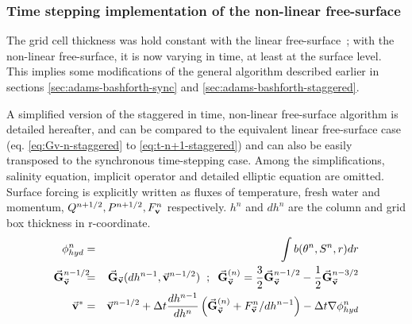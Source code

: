 \subsubsection{Time stepping implementation of the
non-linear free-surface}
\label{sec:nonlin-freesurf-timestepping}

The grid cell thickness was hold constant with the linear
free-surface~; with the non-linear free-surface, it is now varying
in time, at least at the surface level.
This implies some modifications of the general algorithm described
earlier in sections \ref{sec:adams-bashforth-sync} and
\ref{sec:adams-bashforth-staggered}.

A simplified version of the staggered in time, non-linear
free-surface algorithm is detailed hereafter, and can be compared
to the equivalent linear free-surface case (eq. \ref{eq:Gv-n-staggered}
to \ref{eq:t-n+1-staggered}) and can also be easily transposed
to the synchronous time-stepping case.
Among the simplifications, salinity equation, implicit operator
and detailed elliptic equation are omitted. Surface forcing is
explicitly written as fluxes of temperature, fresh water and
momentum, $Q^{n+1/2}, P^{n+1/2}, F_{\bf v}^n$ respectively.
$h^n$ and $dh^n$ are the column and grid box thickness in r-coordinate.
\begin{eqnarray}
\phi^{n}_{hyd} & = & \int b(\theta^{n},S^{n},r) dr
\label{eq:phi-hyd-nlfs} \\
\vec{\bf G}_{\vec{\bf v}}^{n-1/2}\hspace{-2mm} & = &
\vec{\bf G}_{\vec{\bf v}} (dh^{n-1},\vec{\bf v}^{n-1/2})
\hspace{+2mm};\hspace{+2mm}
\vec{\bf G}_{\vec{\bf v}}^{(n)} =
   \frac{3}{2} \vec{\bf G}_{\vec{\bf v}}^{n-1/2}
-  \frac{1}{2} \vec{\bf G}_{\vec{\bf v}}^{n-3/2}
\label{eq:Gv-n-nlfs} \\
\vec{\bf v}^{*} & = & \vec{\bf v}^{n-1/2} + \Delta t \frac{dh^{n-1}}{dh^{n}} \left(
\vec{\bf G}_{\vec{\bf v}}^{(n)} + F_{\vec{\bf v}}^{n}/dh^{n-1} \right)
- \Delta t \nabla \phi_{hyd}^{n}
\label{eq:vstar-nlfs}
\end{eqnarray}
